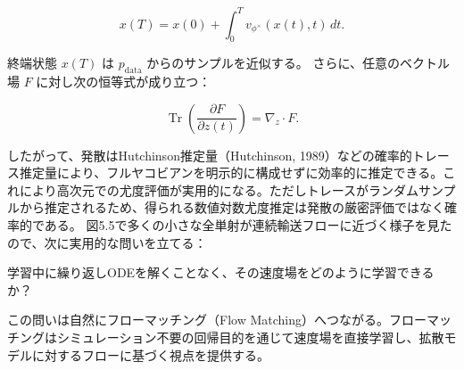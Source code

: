 \[
x(T) = x(0) + \int_0^T v_{\phi^\times}(x(t), t)\, dt.
\]


終端状態 $x(T)$ は $p_{\mathrm{data}}$ からのサンプルを近似する。
さらに、任意のベクトル場 $F$ に対し次の恒等式が成り立つ：

\[
\operatorname{Tr}\!\left(\frac{\partial F}{\partial z(t)}\right) = \nabla_z \cdot F.
\]


したがって、発散はHutchinson推定量（Hutchinson, 1989）などの確率的トレース推定量により、フルヤコビアンを明示的に構成せずに効率的に推定できる。これにより高次元での尤度評価が実用的になる。ただしトレースがランダムサンプルから推定されるため、得られる数値対数尤度推定は発散の厳密評価ではなく確率的である。
図5.5で多くの小さな全単射が連続輸送フローに近づく様子を見たので、次に実用的な問いを立てる：

\begin{propositionbox}[問い 5.1.1]
学習中に繰り返しODEを解くことなく、その速度場をどのように学習できるか？
\end{propositionbox}


この問いは自然にフローマッチング（Flow Matching）へつながる。フローマッチングはシミュレーション不要の回帰目的を通じて速度場を直接学習し、拡散モデルに対するフローに基づく視点を提供する。



